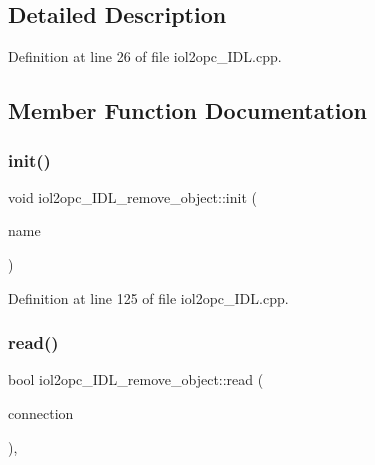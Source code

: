 \subsection{Detailed Description}


Definition at line 26 of file iol2opc\+\_\+\+I\+D\+L.\+cpp.



\subsection{Member Function Documentation}
\mbox{\label{classiol2opc__IDL__remove__object_a73bef92405fbfad5f310d661917a223c}} 
\subsubsection{\texorpdfstring{init()}{init()}}
{\footnotesize\ttfamily void iol2opc\+\_\+\+I\+D\+L\+\_\+remove\+\_\+object\+::init (\begin{DoxyParamCaption}\item[{const std\+::string \&}]{name }\end{DoxyParamCaption})}



Definition at line 125 of file iol2opc\+\_\+\+I\+D\+L.\+cpp.

\mbox{\label{classiol2opc__IDL__remove__object_a3930bc698e02f11567bed49b113a0de4}} 
\subsubsection{\texorpdfstring{read()}{read()}}
{\footnotesize\ttfamily bool iol2opc\+\_\+\+I\+D\+L\+\_\+remove\+\_\+object\+::read (\begin{DoxyParamCaption}\item[{yarp\+::os\+::\+Connection\+Reader \&}]{connection }\end{DoxyParamCaption})\hspace{0.3cm}{\ttfamily [override]}, {\ttfamily [virtual]}}



